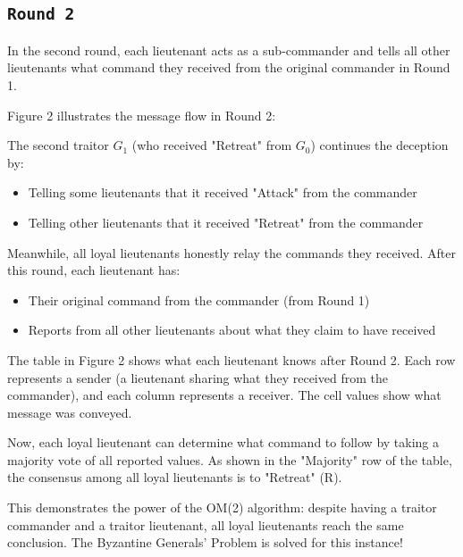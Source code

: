 \documentclass[11pt]{article}
\begin{document}
\subsection*{\texttt{\large Round 2}}
In the second round, each lieutenant acts as a sub-commander and tells all other lieutenants what command they received from the original commander in Round 1.

Figure 2 illustrates the message flow in Round 2:



The second traitor $G_1$ (who received "Retreat" from $G_0$) continues the deception by:
\begin{itemize}
    \item Telling some lieutenants that it received "Attack" from the commander
    \item Telling other lieutenants that it received "Retreat" from the commander
\end{itemize}

Meanwhile, all loyal lieutenants honestly relay the commands they received. After this round, each lieutenant has:
\begin{itemize}
    \item Their original command from the commander (from Round 1)
    \item Reports from all other lieutenants about what they claim to have received
\end{itemize}

The table in Figure 2 shows what each lieutenant knows after Round 2. Each row represents a sender (a lieutenant sharing what they received from the commander), and each column represents a receiver. The cell values show what message was conveyed.

Now, each loyal lieutenant can determine what command to follow by taking a majority vote of all reported values. As shown in the "Majority" row of the table, the consensus among all loyal lieutenants is to "Retreat" (R).

This demonstrates the power of the OM(2) algorithm: despite having a traitor commander and a traitor lieutenant, all loyal lieutenants reach the same conclusion. The Byzantine Generals' Problem is solved for this instance!


%
%
\end{document}
